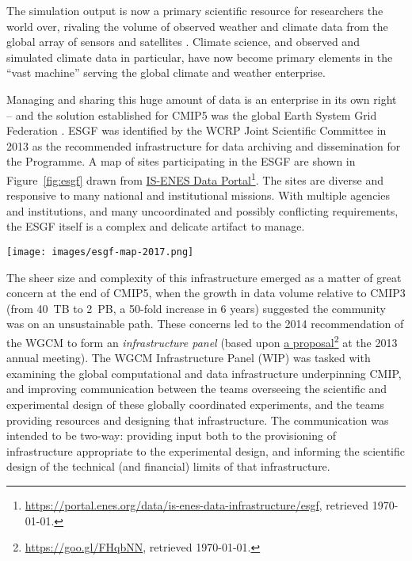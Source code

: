 \documentclass[gmd,manuscript]{copernicus}
\newcommand{\pllabel}[1]{\label{p-#1}\linelabel{l-#1}}
\newcommand{\urlref}[2] {\href{#1}{#2}\footnote{\url{#1}, retrieved \today.}}
\begin{document}
The simulation output is now a primary scientific resource for
researchers the world over, rivaling the volume of observed weather
and climate data from the global array of sensors and satellites
\citep{ref:overpecketal2011}. Climate science, and observed and simulated
climate data in particular, have now become primary elements in the
``vast machine'' \citep{ref:edwards2010} serving the global climate and
weather enterprise.

Managing and sharing this huge amount of data is an enterprise in its
own right -- and the solution established for CMIP5 was the global
Earth System Grid Federation
\citep[ESGF,][]{ref:williamsetal2011a,ref:williamsetal2015}. ESGF was
identified by the WCRP Joint Scientific Committee in 2013 as the
recommended infrastructure for data archiving and dissemination for
the Programme.
\pllabel{RC2-12}
A map of sites participating in the ESGF are shown in
\pllabel{RC2-8}
Figure~\ref{fig:esgf} drawn from
\urlref{https://portal.enes.org/data/is-enes-data-infrastructure/esgf}{IS-ENES
  Data Portal}. The sites are diverse and responsive to many national
and institutional missions. With multiple agencies and institutions,
and many uncoordinated and possibly conflicting requirements, the ESGF
itself is a complex and delicate
\pllabel{RC2-10}
artifact to manage.

\begin{figure*}
  \begin{center}
    \texttt{[image: images/esgf-map-2017.png]}
  \end{center}
  \caption{Sites participating in the Earth System Grid Federation in
    May 2017. Figure courtesy IS-ENES Data Portal. }
  \label{fig:esgf}
\end{figure*}

The sheer size and complexity of this infrastructure emerged as a
matter of great concern at the end of CMIP5, when the growth in data
volume relative to CMIP3 (from 40~TB to 2~PB, a 50-fold increase in 6
years) suggested the community was on an unsustainable path. These
concerns led to the 2014 recommendation of the WGCM to form an
\emph{infrastructure panel} (based upon
\pllabel{RC2-11}
\urlref{https://goo.gl/FHqbNN}{a proposal} at the 2013 annual
meeting). The WGCM Infrastructure Panel (WIP) was tasked with
examining the global computational and data infrastructure
underpinning CMIP, and improving communication between the teams
overseeing the scientific and experimental design of these globally
coordinated experiments, and the teams providing resources and
designing that infrastructure. The communication was intended to be
two-way: providing input both to the provisioning of infrastructure
appropriate to the experimental design, and informing the scientific
design of the technical (and financial) limits of that infrastructure.
\end{document}
